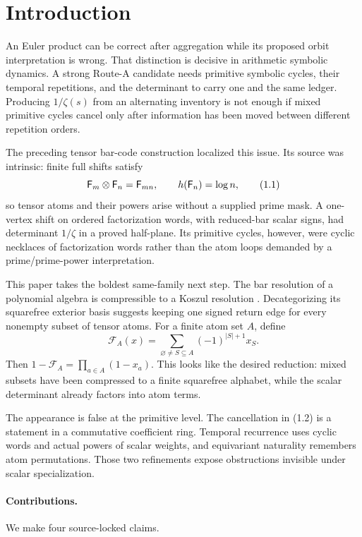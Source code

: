 \section{Introduction}
\label{sec:introduction}

An Euler product can be correct after aggregation while its proposed orbit
interpretation is wrong.  That distinction is decisive in arithmetic
symbolic dynamics.  A strong Route-A candidate needs primitive symbolic
cycles, their temporal repetitions, and the determinant to carry one and the
same ledger.  Producing $1/\zeta(s)$ from an alternating inventory is not
enough if mixed primitive cycles cancel only after information has been moved
between different repetition orders.

The preceding tensor bar-code construction localized this issue.  Its source
was intrinsic: finite full shifts satisfy
\[
  \mathsf F_m\otimes\mathsf F_n=\mathsf F_{mn},\qquad h(\mathsf F_n)=\log n,
  \tag{1.1}
\]
so tensor atoms and their powers arise without a supplied prime mask.  A
one-vertex shift on ordered factorization words, with reduced-bar scalar
signs, had determinant $1/\zeta$ in a proved half-plane.  Its primitive
cycles, however, were cyclic necklaces of factorization words rather than
the atom loops demanded by a prime/prime-power interpretation.

This paper takes the boldest same-family next step.  The bar resolution of a
polynomial algebra is compressible to a Koszul resolution
\citep{priddy1970,skoldberg2006,jollenbeckwelker2009}.  Decategorizing its
squarefree exterior basis suggests keeping one signed return edge for every
nonempty subset of tensor atoms.  For a finite atom set $A$, define
\[
  \mathcal F_A(x)
  =\sum_{\varnothing\ne S\subseteq A}(-1)^{|S|+1}x_S.
  \tag{1.2}
\]
Then $1-\mathcal F_A=\prod_{a\in A}(1-x_a)$.  This looks like the desired
reduction: mixed subsets have been compressed to a finite squarefree
alphabet, while the scalar determinant already factors into atom terms.

The appearance is false at the primitive level.  The cancellation in
(1.2) is a statement in a commutative coefficient ring.  Temporal recurrence
uses cyclic words and actual powers of scalar weights, and equivariant
naturality remembers atom permutations.  Those two refinements expose
obstructions invisible under scalar specialization.

\paragraph{Contributions.}
We make four source-locked claims.

